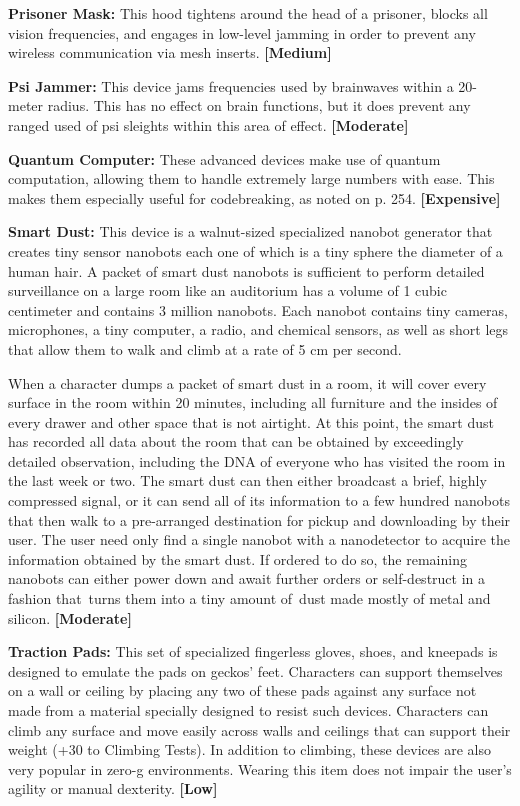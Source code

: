 \textbf{Prisoner Mask:} This hood tightens around the 
head of a prisoner, blocks all vision frequencies, and 
engages in low-level jamming in order to prevent any 
wireless communication via mesh inserts. \textbf{[Medium]}

\textbf{Psi Jammer:} This device jams frequencies used 
by brainwaves within a 20-meter radius. This has 
no effect on brain functions, but it does prevent 
any ranged used of psi sleights within this area of 
effect. \textbf{[Moderate]}

\textbf{Quantum Computer:} These advanced devices 
make use of quantum computation, allowing them 
to handle extremely large numbers with ease. This 
makes them especially useful for codebreaking, as 
noted on p. 254. \textbf{[Expensive]}

\textbf{Smart Dust:} This device is a walnut-sized specialized
nanobot generator that creates tiny sensor nanobots
each one of which is a tiny sphere the diameter
of a human hair. A packet of smart dust nanobots is 
sufficient to perform detailed surveillance on a large 
room like an auditorium has a volume of 1 cubic 
centimeter and contains 3 million nanobots. Each 
nanobot contains tiny cameras, microphones, a tiny 
computer, a radio, and chemical sensors, as well as 
short legs that allow them to walk and climb at a rate 
of 5 cm per second.

When a character dumps a packet of smart dust in 
a room, it will cover every surface in the room within 
20 minutes, including all furniture and the insides 
of every drawer and other space that is not airtight. 
At this point, the smart dust has recorded all data 
about the room that can be obtained by exceedingly 
detailed observation, including the DNA of everyone 
who has visited the room in the last week or two. The 
smart dust can then either broadcast a brief, highly 
compressed signal, or it can send all of its information
to a few hundred nanobots that then walk to a
pre-arranged destination for pickup and downloading 
by their user. The user need only find a single nanobot
with a nanodetector to acquire the information
obtained by the smart dust. If ordered to do so, the 
remaining nanobots can either power down and await 
further orders or self-destruct in a fashion that turns 
them into a tiny amount of dust made mostly of metal 
and silicon. \textbf{[Moderate]}

\textbf{Traction Pads:} This set of specialized fingerless 
gloves, shoes, and kneepads is designed to emulate the 
pads on geckos' feet. Characters can support themselves
on a wall or ceiling by placing any two of these
pads against any surface not made from a material 
specially designed to resist such devices. Characters 
can climb any surface and move easily across walls 
and ceilings that can support their weight (+30 to 
Climbing Tests). In addition to climbing, these devices 
are also very popular in zero-g environments. Wearing 
this item does not impair the user's agility or manual 
dexterity. \textbf{[Low]}

